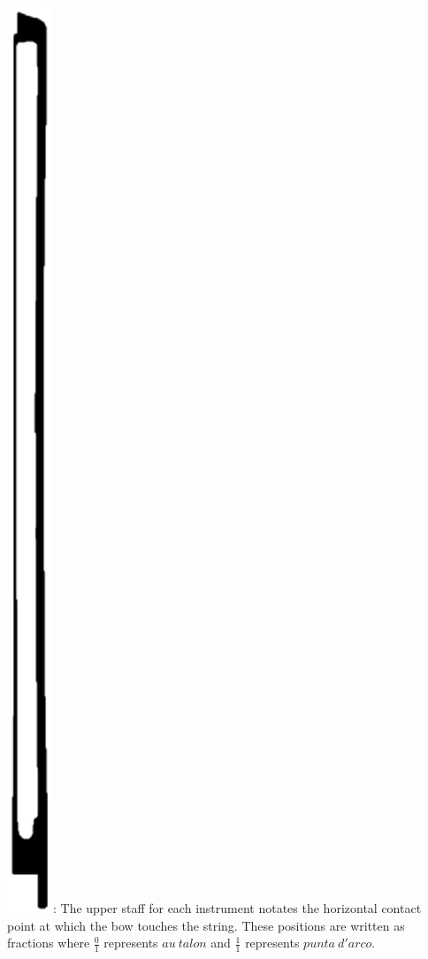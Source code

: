 \documentclass[10pt]{article}
\begin{document}
\begingroup
\begin{center}
 \hspace{0.5mm} \includegraphics[height=0.020\textheight]{bow_position_tablature.eps}: The upper staff for each instrument notates the horizontal contact point at which the bow touches the string. These positions are written as fractions where \( \frac{0}{1} \) represents $au \ talon$ and \( \frac{1}{1} \) represents $punta \ d'arco$.
\rightskip\leftskip
\phantom{text} \hfill \phantom{()}
\end{center}
\endgroup
\end{document}
